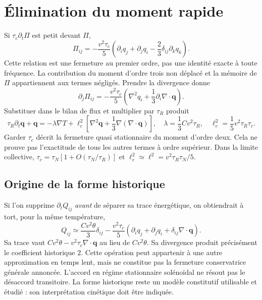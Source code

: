 \documentclass[11pt,a4paper]{article}
\begin{document}
\section{Élimination du moment rapide}
Si $\tau_c\partial_t\Pi$ est petit devant $\Pi$,
\[
 \Pi_{ij}=-\frac{v^2\tau_c}{5}
 \left(\partial_iq_j+\partial_jq_i
             -\frac23\delta_{ij}\partial_kq_k\right).
\]
Cette relation est une fermeture au premier ordre, pas une identité exacte
à toute fréquence. La contribution du moment d'ordre trois non déplacé et
la mémoire de $\Pi$ appartiennent aux termes négligés.
Prendre la divergence donne
\[
 \partial_j\Pi_{ij}
 =-\frac{v^2\tau_c}{5}
   \left(\nabla^2q_i+\frac13\partial_i\nabla\cdot\mathbf q\right).
\]
Substituer dans le bilan de flux et multiplier par $\tau_R$ produit
\[
 \tau_R\partial_t\mathbf q+\mathbf q
 =-\lambda\nabla T+\ell_c^2
   \left[\nabla^2\mathbf q+\frac13\nabla(\nabla\cdot\mathbf q)\right],
 \quad \lambda=\frac13Cv^2\tau_R,\quad
 \ell_c^2=\frac15v^2\tau_R\tau_c .
\]
Garder $\tau_c$ décrit la fermeture quasi stationnaire du moment d'ordre deux.
Cela ne prouve pas l'exactitude de tous les autres termes à ordre supérieur.
Dans la limite collective, $\tau_c=\tau_N[1+O(\tau_N/\tau_R)]$ et
$\ell_c^2\simeq\ell^2=v^2\tau_R\tau_N/5$.

\subsection{Origine de la forme historique}
Si l'on supprime $\partial_tQ_{ij}$ \emph{avant} de séparer sa trace énergétique,
on obtiendrait à tort, pour la même température,
\[
 Q_{ij}\simeq\frac{Cv^2\theta}{3}\delta_{ij}
 -\frac{v^2\tau_c}{5}
   (\partial_iq_j+\partial_jq_i+\delta_{ij}\nabla\cdot\mathbf q).
\]
Sa trace vaut $Cv^2\theta-v^2\tau_c\nabla\cdot\mathbf q$ au lieu de
$Cv^2\theta$. Sa divergence produit précisément le coefficient historique $2$.
Cette opération peut appartenir à une autre approximation en temps lent,
mais ne constitue pas la fermeture conservatrice générale annoncée.
L'accord en régime stationnaire solénoïdal ne résout pas le désaccord transitoire.
La forme historique reste un modèle constitutif utilisable et étudié :
son interprétation cinétique doit être indiquée.
\end{document}
